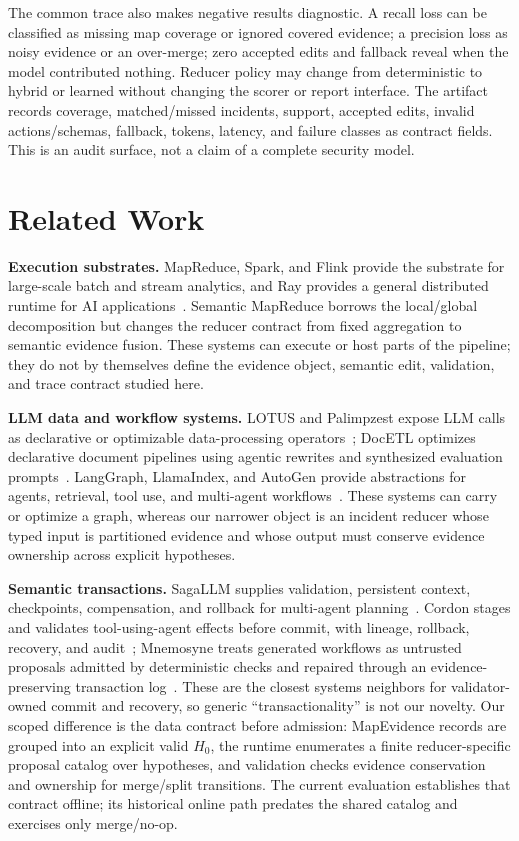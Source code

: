 \documentclass[sigplan,anonymous,nonacm]{acmart}
\newcommand{\systemname}{Semantic MapReduce}
\begin{document}
The common trace also makes negative results diagnostic. A recall loss can be classified as missing map coverage or ignored covered evidence; a precision loss as noisy evidence or an over-merge; zero accepted edits and fallback reveal when the model contributed nothing. Reducer policy may change from deterministic to hybrid or learned without changing the scorer or report interface. The artifact records coverage, matched/missed incidents, support, accepted edits, invalid actions/schemas, fallback, tokens, latency, and failure classes as contract fields. This is an audit surface, not a claim of a complete security model.

\section{Related Work}

\textbf{Execution substrates.} MapReduce, Spark, and Flink provide the substrate for large-scale batch and stream analytics, and Ray provides a general distributed runtime for AI applications~\cite{dean2004mapreduce,zaharia2012spark,carbone2015flink,moritz2018ray}. \systemname{} borrows the local/global decomposition but changes the reducer contract from fixed aggregation to semantic evidence fusion. These systems can execute or host parts of the pipeline; they do not by themselves define the evidence object, semantic edit, validation, and trace contract studied here.

\textbf{LLM data and workflow systems.} LOTUS and Palimpzest expose LLM calls as declarative or optimizable data-processing operators~\cite{patel2024semanticoperators,liu2024palimpzest}; DocETL optimizes declarative document pipelines using agentic rewrites and synthesized evaluation prompts~\cite{shankar2024docetl}. LangGraph, LlamaIndex, and AutoGen provide abstractions for agents, retrieval, tool use, and multi-agent workflows~\cite{langchain2026langgraph,llamaindex2026,wu2023autogen}. These systems can carry or optimize a graph, whereas our narrower object is an incident reducer whose typed input is partitioned evidence and whose output must conserve evidence ownership across explicit hypotheses.

\textbf{Semantic transactions.} SagaLLM supplies validation, persistent context, checkpoints, compensation, and rollback for multi-agent planning~\cite{chang2025sagallm}. Cordon stages and validates tool-using-agent effects before commit, with lineage, rollback, recovery, and audit~\cite{chen2026cordon}; Mnemosyne treats generated workflows as untrusted proposals admitted by deterministic checks and repaired through an evidence-preserving transaction log~\cite{chang2026mnemosyne}. These are the closest systems neighbors for validator-owned commit and recovery, so generic ``transactionality'' is not our novelty. Our scoped difference is the data contract before admission: \textsf{MapEvidence} records are grouped into an explicit valid $H_0$, the runtime enumerates a finite reducer-specific proposal catalog over hypotheses, and validation checks evidence conservation and ownership for merge/split transitions. The current evaluation establishes that contract offline; its historical online path predates the shared catalog and exercises only merge/no-op.
\end{document}
